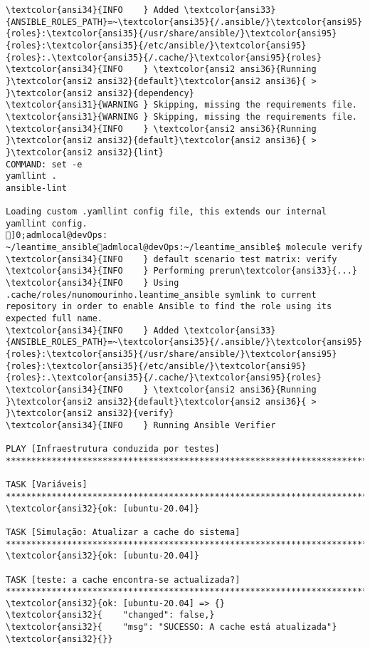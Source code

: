 \documentclass{scrartcl}
\begin{document}
\begin{Verbatim}
\textcolor{ansi34}{INFO    } Added \textcolor{ansi33}{ANSIBLE_ROLES_PATH}=~\textcolor{ansi35}{/.ansible/}\textcolor{ansi95}{roles}:\textcolor{ansi35}{/usr/share/ansible/}\textcolor{ansi95}{roles}:\textcolor{ansi35}{/etc/ansible/}\textcolor{ansi95}{roles}:.\textcolor{ansi35}{/.cache/}\textcolor{ansi95}{roles}
\textcolor{ansi34}{INFO    } \textcolor{ansi2 ansi36}{Running }\textcolor{ansi2 ansi32}{default}\textcolor{ansi2 ansi36}{ > }\textcolor{ansi2 ansi32}{dependency}
\textcolor{ansi31}{WARNING } Skipping, missing the requirements file.
\textcolor{ansi31}{WARNING } Skipping, missing the requirements file.
\textcolor{ansi34}{INFO    } \textcolor{ansi2 ansi36}{Running }\textcolor{ansi2 ansi32}{default}\textcolor{ansi2 ansi36}{ > }\textcolor{ansi2 ansi32}{lint}
COMMAND: set -e
yamllint .
ansible-lint

Loading custom .yamllint config file, this extends our internal yamllint config.
]0;admlocal@devOps: ~/leantime_ansibleadmlocal@devOps:~/leantime_ansible$ molecule verify
\textcolor{ansi34}{INFO    } default scenario test matrix: verify
\textcolor{ansi34}{INFO    } Performing prerun\textcolor{ansi33}{...}
\textcolor{ansi34}{INFO    } Using .cache/roles/nunomourinho.leantime_ansible symlink to current repository in order to enable Ansible to find the role using its expected full name.
\textcolor{ansi34}{INFO    } Added \textcolor{ansi33}{ANSIBLE_ROLES_PATH}=~\textcolor{ansi35}{/.ansible/}\textcolor{ansi95}{roles}:\textcolor{ansi35}{/usr/share/ansible/}\textcolor{ansi95}{roles}:\textcolor{ansi35}{/etc/ansible/}\textcolor{ansi95}{roles}:.\textcolor{ansi35}{/.cache/}\textcolor{ansi95}{roles}
\textcolor{ansi34}{INFO    } \textcolor{ansi2 ansi36}{Running }\textcolor{ansi2 ansi32}{default}\textcolor{ansi2 ansi36}{ > }\textcolor{ansi2 ansi32}{verify}
\textcolor{ansi34}{INFO    } Running Ansible Verifier

PLAY [Infraestrutura conduzida por testes] ***********************************************************************************************

TASK [Variáveis] *************************************************************************************************************************
\textcolor{ansi32}{ok: [ubuntu-20.04]}

TASK [Simulação: Atualizar a cache do sistema] *******************************************************************************************
\textcolor{ansi32}{ok: [ubuntu-20.04]}

TASK [teste: a cache encontra-se actualizada?] *******************************************************************************************
\textcolor{ansi32}{ok: [ubuntu-20.04] => {}
\textcolor{ansi32}{    "changed": false,}
\textcolor{ansi32}{    "msg": "SUCESSO: A cache está atualizada"}
\textcolor{ansi32}{}}


\end{Verbatim}
\end{document}

